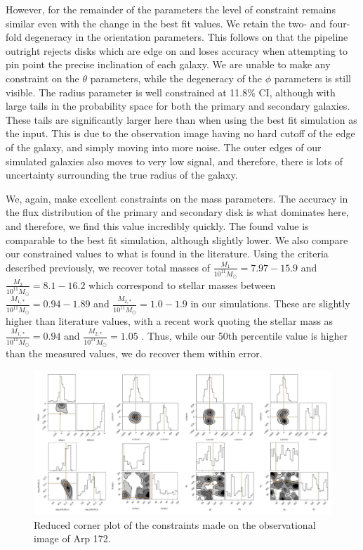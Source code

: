 However, for the remainder of the parameters the level of constraint remains similar even with the change in the best fit values. We retain the two- and four-fold degeneracy in the orientation parameters. This follows on that the pipeline outright rejects disks which are edge on and loses accuracy when attempting to pin point the precise inclination of each galaxy. We are unable to make any constraint on the $\theta$ parameters, while the degeneracy of the $\phi$ parameters is still visible. The radius parameter is well constrained at 11.8\% CI, although with large tails in the probability space for both the primary and secondary galaxies. These tails are significantly larger here than when using the best fit simulation as the input. This is due to the observation image having no hard cutoff of the edge of the galaxy, and simply moving into more noise. The outer edges of our simulated galaxies also moves to very low signal, and therefore, there is lots of uncertainty surrounding the true radius of the galaxy. 

We, again, make excellent constraints on the mass parameters. The accuracy in the flux distribution of the primary and secondary disk is what dominates here, and therefore, we find this value incredibly quickly. The found value is comparable to the best fit simulation, although slightly lower. We also compare our constrained values to what is found in the literature. Using the criteria described previously, we recover total masses of $\frac{M_{1}}{10^{11}M_{\odot}} = 7.97 - 15.9$ and $\frac{M_{2}}{10^{11}M_{\odot}} = 8.1 - 16.2$ which correspond to stellar masses between $\frac{M_{1,*}}{10^{11}M_{\odot}} =  0.94 - 1.89$ and $\frac{M_{2, *}}{10^{11}M_{\odot}} = 1.0 - 1.9$ in our simulations. These are slightly higher than literature values, with a recent work quoting the stellar mass as $\frac{M_{1, *}}{10^{11}M_{\odot}} = 0.94 $ and $\frac{M_{2, *}}{10^{11}M_{\odot}} = 1.05$ \citep{2020MNRAS.496.5243H}. Thus, while our 50th percentile value is higher than the measured values, we do recover them within error.

\begin{figure}
    \centering
    \includegraphics[width=\textwidth]{Chapter1/figures/Arp172-obs-red-corner.pdf}
    \caption[Reduced corner plot of the constraints made on the observational image of Arp 172.]{Reduced corner plot of the constraints made on the observational image of Arp 172.}
    \label{fig:Arp172-obs}
\end{figure}


